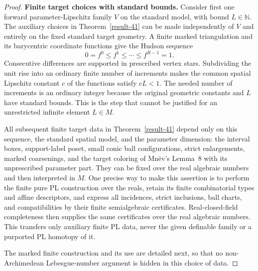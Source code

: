 \documentclass[11pt,a4paper]{article}
\theoremstyle{definition}
\begin{document}
\begin{proof}
\textbf{Finite target choices with standard bounds.}\quad
Consider first one forward parameter-Lipschitz family $V$
on the standard model, with bound $L\in\mathbb N$.
The auxiliary choices in Theorem~\ref{result-41} can be made independently of
$V$ and entirely on the fixed standard target geometry.
A finite marked triangulation and its barycentric coordinate
functions give the Hudson sequence
\[
 0=f^0\le f^1\le\cdots\le f^{R-1}=1.
\]
Consecutive differences are supported in prescribed vertex
stars. Subdividing the unit rise into an ordinary finite
number of increments makes the common spatial Lipschitz
constant $c$ of the functions satisfy $cL<1$.
The needed number of increments is an ordinary integer
because the original geometric constants and $L$ have
standard bounds. This is the step that cannot be justified
for an unrestricted infinite element $L\in M$.

All subsequent finite target data in Theorem~\ref{result-41} depend only on
this sequence, the standard spatial model, and the parameter
dimension: the interval boxes, support-label poset, small
conic ball configurations, strict enlargements, marked
coarsenings, and the target coloring of Mn\"ev's Lemma~8
with its unprescribed parameter part. They can be fixed over
the real algebraic numbers and then interpreted in $M$.
One precise way to make this assertion is to perform the
finite pure PL construction over the reals, retain its
finite combinatorial types and affine descriptors, and
express all incidences, strict inclusions, ball charts, and
compatibilities by their finite semialgebraic certificates.
Real-closed-field completeness then supplies the same
certificates over the real algebraic numbers. This transfers
only auxiliary finite PL data, never the given definable
family or a purported PL homotopy of it.

The marked finite construction and its use are detailed next,
so that no non-Archimedean Lebesgue-number argument is hidden
in this choice of data.



\end{proof}
\end{document}
